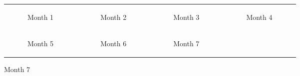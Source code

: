 \newpage
\begin{minipage}[t]{0.7\textwidth}
\begin{figure}[H]
  \begin{adjustbox}{width=\textwidth, keepaspectratio}
      \begin{tabular}{cccc}
          \begin{subfigure}[b]{0.24\textwidth}
              \centering
              
              \caption{Month 1}
              \label{fig:month1}
          \end{subfigure} &
          \begin{subfigure}[b]{0.24\textwidth}
              \centering
              
              \caption{Month 2}
              \label{fig:month2}
          \end{subfigure} &
          \begin{subfigure}[b]{0.24\textwidth}
              \centering
              
              \caption{Month 3}
              \label{fig:month3}
          \end{subfigure} &
          \begin{subfigure}[b]{0.24\textwidth}
              \centering
              
              \caption{Month 4}
              \label{fig:month4}
          \end{subfigure} \\
          \begin{subfigure}[b]{0.24\textwidth}
              \centering
              
              \caption{Month 5}
              \label{fig:month5}
          \end{subfigure} &
          \begin{subfigure}[b]{0.24\textwidth}
              \centering
              
              \caption{Month 6}
              \label{fig:month6}
          \end{subfigure} &
          \begin{subfigure}[b]{0.24\textwidth}
              \centering
              
              \caption{Month 7}
              \label{fig:month7}
          \end{subfigure} &

\end{tabular}
\end{adjustbox}
\end{figure}
\end{minipage}
